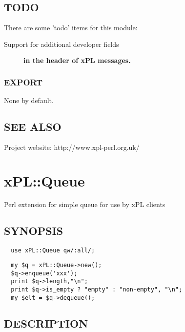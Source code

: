 \documentclass[12pt,a4paper]{article}
\begin{document}
\subsection*{TODO\label{xPL::Message_TODO}}


There are some 'todo' items for this module:

\begin{description}

\item[{Support for additional developer fields}] \textbf{in the header of xPL messages.}\end{description}
\subsubsection*{EXPORT\label{xPL::Message_EXPORT}}


None by default.

\subsection*{SEE ALSO\label{xPL::Message_SEE_ALSO}}


Project website: http://www.xpl-perl.org.uk/

\newpage
\section{xPL::Queue\label{xPL::Queue}}


Perl extension for simple queue for use by xPL clients

\subsection*{SYNOPSIS\label{xPL::Queue_SYNOPSIS}}
\begin{verbatim}
  use xPL::Queue qw/:all/;
\end{verbatim}
\begin{verbatim}
  my $q = xPL::Queue->new();
  $q->enqueue('xxx');
  print $q->length,"\n";
  print $q->is_empty ? "empty" : "non-empty", "\n";
  my $elt = $q->dequeue();
\end{verbatim}
\subsection*{DESCRIPTION\label{xPL::Queue_DESCRIPTION}}
\end{document}
